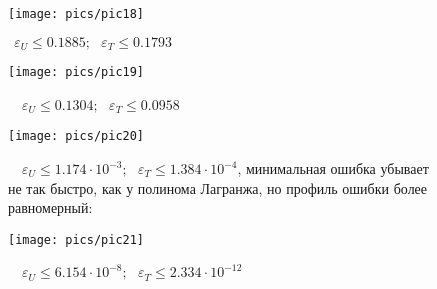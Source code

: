 \begin{figure}[H]
    \centering
    \caption{$~~\varepsilon_U\le0.1885;~~~\varepsilon_T\le0.1793$}
    \texttt{[image: pics/pic18]}
    \label{pic:18}
\end{figure}
\begin{figure}[H]
    \centering
    \caption{~~$\varepsilon_U\le0.1304;~~~\varepsilon_T\le0.0958$}
    \texttt{[image: pics/pic19]}
    \label{pic:19}
\end{figure}
\begin{figure}[H]
    \centering
    \caption{~~$\varepsilon_U\le1.174\cdot10^{-3};~~~\varepsilon_T\le1.384\cdot10^{-4}$, минимальная ошибка убывает не так быстро, как у полинома Лагранжа, но профиль ошибки более равномерный:}
    \texttt{[image: pics/pic20]}
    \label{pic:20}
\end{figure}
\begin{figure}[H]
    \centering
    \caption{~~$\varepsilon_U\le6.154\cdot10^{-8};~~~\varepsilon_T\le2.334\cdot10^{-12}$}
    \texttt{[image: pics/pic21]}
    \label{pic:21}
\end{figure}
